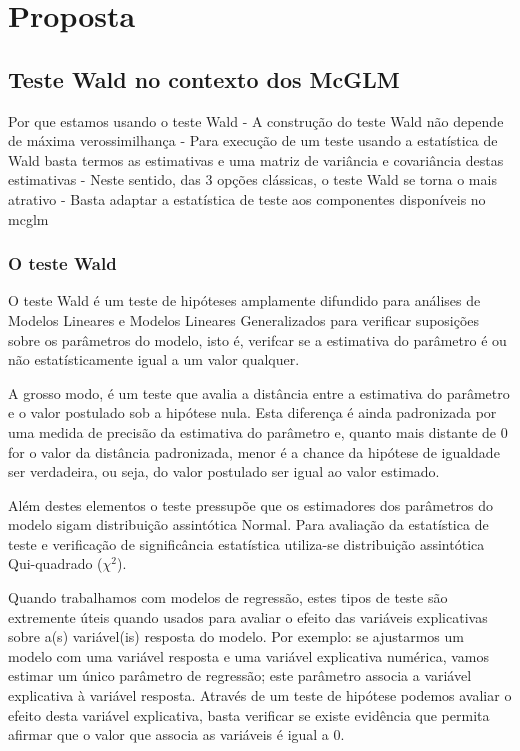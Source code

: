 
\chapter{Proposta}

\label{cap:proposta}

\section{Teste Wald no contexto dos McGLM}

Por que estamos usando o teste Wald
 - A construção do teste Wald não depende de máxima verossimilhança
 - Para execução de um teste usando a estatística de Wald basta termos as estimativas e uma matriz de variância e covariância destas estimativas
 - Neste sentido, das 3 opções clássicas, o teste Wald se torna o mais atrativo 
 - Basta adaptar a estatística de teste aos componentes disponíveis no mcglm


\subsection{O teste Wald}

O teste Wald é um teste de hipóteses amplamente difundido para análises de Modelos Lineares e Modelos Lineares Generalizados para verificar suposições sobre os parâmetros do modelo, isto é, verifcar se a estimativa do parâmetro é ou não estatísticamente igual a um valor qualquer.

A grosso modo, é um teste que avalia a distância entre a estimativa do parâmetro e o valor postulado sob a hipótese nula. Esta diferença é ainda padronizada por uma medida de precisão da estimativa do parâmetro e, quanto mais distante de 0 for o valor da distância padronizada, menor é a chance da hipótese de igualdade ser verdadeira, ou seja, do valor postulado ser igual ao valor estimado.

Além destes elementos o teste pressupõe que os estimadores dos parâmetros do modelo sigam distribuição assintótica Normal. Para avaliação da estatística de teste e verificação de significância estatística utiliza-se distribuição assintótica Qui-quadrado ($\chi^2$).

Quando trabalhamos com modelos de regressão, estes tipos de teste são extremente úteis quando usados para avaliar o efeito das variáveis explicativas sobre a(s) variável(is) resposta do modelo. Por exemplo: se ajustarmos um modelo com uma variável resposta e uma variável explicativa numérica, vamos estimar um único parâmetro de regressão; este parâmetro associa a variável explicativa à variável resposta. Através de um teste de hipótese podemos avaliar o efeito desta variável explicativa, basta verificar se existe evidência que permita afirmar que o valor que associa as variáveis é igual a 0. 

